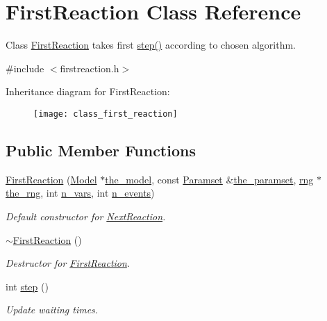 \hypertarget{class_first_reaction}{}\section{First\+Reaction Class Reference}
\label{class_first_reaction}


Class \hyperlink{class_first_reaction}{First\+Reaction} takes first \hyperlink{class_first_reaction_aed63c3c95d20b2ad557dabb6c5376a73}{step()} according to chosen algorithm.  




{\ttfamily \#include $<$firstreaction.\+h$>$}

Inheritance diagram for First\+Reaction\+:\begin{figure}[H]
\begin{center}
\leavevmode
\texttt{[image: class\_first\_reaction]}
\end{center}
\end{figure}
\subsection*{Public Member Functions}
\begin{DoxyCompactItemize}
\item 
\hyperlink{class_first_reaction_a5122d48f6ecbe17a75cecd41b06ac4a2}{First\+Reaction} (\hyperlink{class_model}{Model} $\ast$\hyperlink{class_realization_a47ec1d062b8caee874b08c1a17d6aeeb}{the\+\_\+model}, const \hyperlink{class_paramset}{Paramset} \&\hyperlink{class_realization_a119bb29de88929bc51bc1b329473a94b}{the\+\_\+paramset}, \hyperlink{classrng}{rng} $\ast$\hyperlink{class_realization_ac8d358d929afae90cf5790675b6744f9}{the\+\_\+rng}, int \hyperlink{class_realization_ad9951a0829e68e12fcb3817735bb5097}{n\+\_\+vars}, int \hyperlink{class_realization_afb711282bef806fc0020f91252d1df2c}{n\+\_\+events})
\begin{DoxyCompactList}\small\item\em Default constructor for \hyperlink{class_next_reaction}{Next\+Reaction}. \end{DoxyCompactList}\item 
\hyperlink{class_first_reaction_ae2d082e400c86abd63ae8a30683c0469}{$\sim$\+First\+Reaction} ()
\begin{DoxyCompactList}\small\item\em Destructor for \hyperlink{class_first_reaction}{First\+Reaction}. \end{DoxyCompactList}\item 
int \hyperlink{class_first_reaction_aed63c3c95d20b2ad557dabb6c5376a73}{step} ()
\begin{DoxyCompactList}\small\item\em Update waiting times. \end{DoxyCompactList}\end{DoxyCompactItemize}
